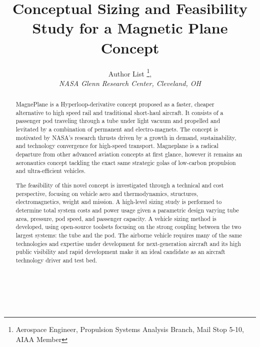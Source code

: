 \documentclass[]             %
{aiaa-tc}                       %
\title{Conceptual Sizing and Feasibility Study for a Magnetic Plane Concept}
\author{
  Author List%
     \footnote{Aerospace Engineer, Propulsion Systems Analysis Branch, Mail Stop 5-10, AIAA Member},
  \\
  {\normalsize\itshape
  NASA Glenn Research Center, Cleveland, OH}
}
\begin{document}
\maketitle

\begin{abstract}
MagnePlane is a Hyperloop-derivative concept proposed as a faster,
cheaper alternative to high speed rail and traditional short-haul aircraft.
It consists of a passenger pod traveling through a tube under light vacuum and
propelled and levitated by a combination of permanent and electro-magnets.
The concept is motivated by NASA's research thrusts driven by a growth in
demand, sustainability, and technology convergence for high-speed transport.
Magneplane is a radical departure from other advanced aviation concepts at
first glance, however it remains an aeronautics concept tackling the exact
same strategic golas of low-carbon propulsion and ultra-efficient vehicles.

The feasibility of this novel concept is investigated through a technical
and cost perspective, focusing on vehicle aero and thermodynamics, structures,
electromagnetics, weight and mission.
A high-level sizing study is performed to determine total system costs and
power usage given a parametric design varying tube area,
pressure, pod speed, and passenger capacity.
A vehicle sizing method is developed, using open-source toolsets focusing on
the strong coupling between the two largest systems: the tube and the pod.
The airborne vehicle requires many of the same technologies and expertise
under development for next-generation aircraft and its high public visibility
and rapid development make it an ideal candidate as an aircraft
technology driver and test bed.
\\
\\
\\
\\

\end{abstract}

\setcounter{secnumdepth}{1}
\setcounter{tocdepth}{1}
\printnomenclature






\end{document}

